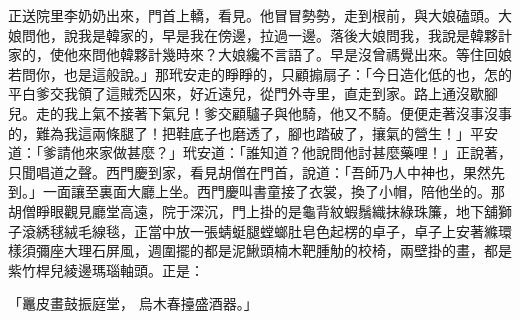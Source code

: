 \begin{showcontents}{}
正送院里李奶奶出來，門首上轎，看見。他冒冒勢勢，走到根前，與大娘磕頭。大娘問他，說我是韓家的，早是我在傍邊，拉過一邊。落後大娘問我，我說是韓夥計家的，使他來問他韓夥計幾時來？大娘纔不言語了。早是沒曾禡覺出來。等住回娘若問你，也是這般說。」那玳安走的睜睜的，只顧搧扇子：「今日造化低的也，怎的平白爹交我領了這賊禿囚來，好近遠兒，從門外寺里，直走到家。路上通沒歇腳兒。走的我上氣不接著下氣兒！爹交顧驢子與他騎，他又不騎。便便走著沒事沒事的，難為我這兩條腿了！把鞋底子也磨透了，腳也踏破了，攘氣的營生！」平安道：「爹請他來家做甚麼？」玳安道：「誰知道？他說問他討甚麼藥哩！」正說著，只聞唱道之聲。西門慶到家，看見胡僧在門首，說道：「吾師乃人中神也，果然先到。」一面讓至裏面大廳上坐。西門慶叫書童接了衣裳，換了小帽，陪他坐的。那胡僧睜眼觀見廳堂高遠，院于深沉，門上掛的是龜背紋蝦鬚織抹綠珠簾，地下舖獅子滾綉毬絨毛線毯，正當中放一張蜻蜓腿螳螂肚皂色起楞的卓子，卓子上安著縧環樣須彌座大理石屏風，週圍擺的都是泥鰍頭楠木靶腫觔的校椅，兩壁掛的畫，都是紫竹桿兒綾邊瑪瑙軸頭。正是：

「鼉皮畫鼓振庭堂， 烏木春擡盛酒器。」


\end{showcontents}

